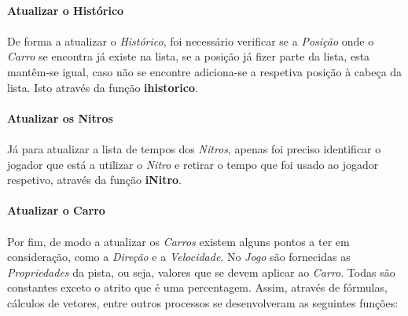 \documentclass[12pt,a4paper]{report}
\begin{document}
\paragraph{}\textbf{Atualizar o Histórico}

\paragraph{} De forma a atualizar o \textit{Histórico}, foi necessário verificar se a \textit{Posição} onde o \textit{Carro} se encontra já existe na lista, se a posição já fizer parte da lista, esta mantêm-se igual, caso não se encontre adiciona-se a respetiva posição à cabeça da lista. Isto através da função \textbf{ihistorico}.

\paragraph{}\textbf{Atualizar os Nitros}

\paragraph{} Já para atualizar a lista de tempos dos \textit{Nitros}, apenas foi preciso identificar o jogador que está a utilizar o \textit{Nitro} e retirar o tempo que foi usado ao jogador respetivo, através da função \textbf{iNitro}.

\paragraph{}\textbf{Atualizar o Carro}

\paragraph{} Por fim, de modo a atualizar os \textit{Carros} existem alguns pontos a ter em consideração, como a \textit{Direção} e a \textit{Velocidade}. No \textit{Jogo} são fornecidas as \textit{Propriedades} da pista, ou seja, valores que se devem aplicar ao \textit{Carro}. Todas são constantes exceto o atrito que é uma percentagem. Assim, através de fórmulas, cálculos de vetores, entre outros processos se desenvolveram as seguintes funções:
\end{document}
